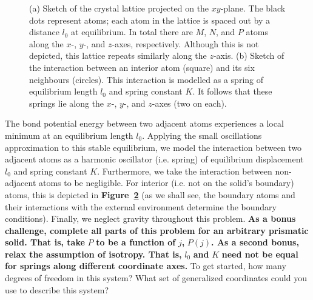 \documentclass[letterpaper,12pt]{article}
\begin{document}
\begin{flushleft}
\begin{figure}[h]
\begin{subfigure}[b]{0.3\textwidth}
            \caption{}
            \label{fig:I3}
        \end{subfigure}
        \caption{(a) Sketch of the crystal lattice projected on the $xy$-plane. The black dots represent atoms; each atom in the lattice is spaced out by a distance $l_0$ at equilibrium. In total there are $M$, $N$, and $P$ atoms along the $x$-, $y$-, and $z$-axes, respectively. Although this is not depicted, this lattice repeats similarly along the $z$-axis. (b) Sketch of the interaction between an interior atom (square) and its six neighbours (circles). This interaction is modelled as a spring of equilibrium length $l_0$ and spring constant $K$. It follows that these springs lie along the $x$-, $y$-, and $z$-axes (two on each).}
    \end{figure}
    The bond potential energy between two adjacent atoms experiences a local minimum at an equilibrium length $l_0$. Applying the small oscillations approximation to this stable equilibrium, we model the interaction between two adjacent atoms as a harmonic oscillator (i.e. spring) of equilibrium displacement $l_0$ and spring constant $K$. Furthermore, we take the interaction between non-adjacent atoms to be negligible. For interior (i.e. not on the solid's boundary) atoms, this is depicted in \textbf{Figure~\ref{fig:I3}} (as we shall see, the boundary atoms and their interactions with the external environment determine the boundary conditions). Finally, we neglect gravity throughout this problem.\newline\newline
    \textbf{As a bonus challenge, complete all parts of this problem for an arbitrary prismatic solid. That is, take} $P$ \textbf{to be a function of} $j$\textbf{,} $P(j)$\textbf{. As a second bonus, relax the assumption of isotropy. That is,} $l_0$ \textbf{and} $K$ \textbf{need not be equal for springs along different coordinate axes.}\newline\newline
    To get started, how many degrees of freedom in this system? What set of generalized coordinates could you use to describe this system?


\end{flushleft}
\end{document}
